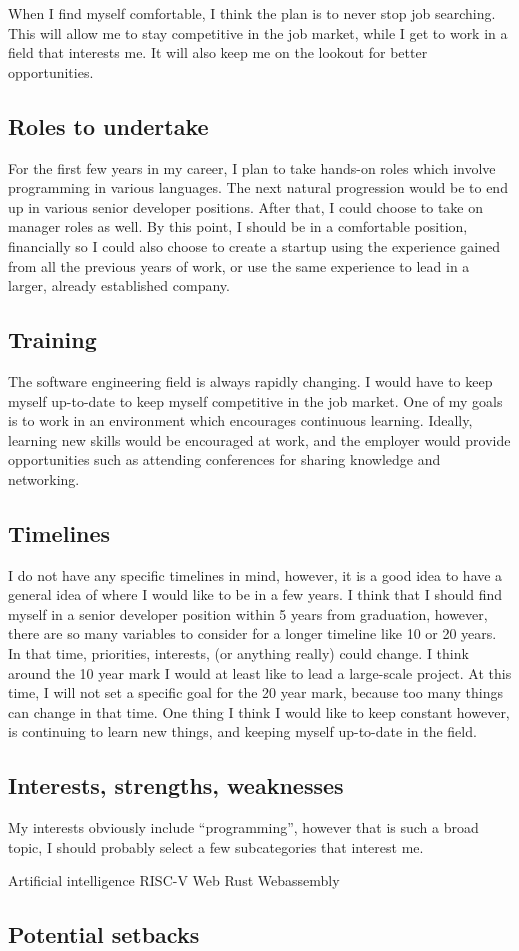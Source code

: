When I find myself comfortable, I think the plan is to never stop job searching.
This will allow me to stay competitive in the job market\cite{kleiman_2015},
while I get to work in a field that interests me. It will also keep me on the
lookout for better opportunities.


\subsection{Roles to undertake}
For the first few years in my career, I plan to take hands-on roles which
involve programming in various languages. The next natural progression would be
to end up in various senior developer positions. After that, I could choose to
take on manager roles as well. By this point, I should be in a comfortable
position, financially so I could also choose to create a startup using the
experience gained from all the previous years of work, or use the same
experience to lead in a larger, already established company.

\subsection{Training}
The software engineering field is always rapidly changing. I would have to keep
myself up-to-date to keep myself competitive in the job market. One of my goals
is to work in an environment which encourages continuous learning. Ideally,
learning new skills would be encouraged at work, and the employer would provide
opportunities such as attending conferences for sharing knowledge and
networking. 

\subsection{Timelines}
I do not have any specific timelines in mind, however, it is a good idea to have
a general idea of where I would like to be in a few years. I think that I
should find myself in a senior developer position within 5 years from
graduation, however, there are so many variables to consider for a longer
timeline like 10 or 20 years. In that time, priorities, interests, (or anything
really) could change. I think around the 10 year mark I would at least like to
lead a large-scale project. At this time, I will not set a specific goal for the
20 year mark, because too many things can change in that time. One thing I think
I would like to keep constant however, is continuing to learn new things, and
keeping myself up-to-date in the field. 

\subsection{Interests, strengths, weaknesses}
My interests obviously include ``programming'', however that is such a broad
topic, I should probably select a few subcategories that interest me. 

Artificial intelligence
RISC-V
Web
Rust
Webassembly



\subsection{Potential setbacks}
